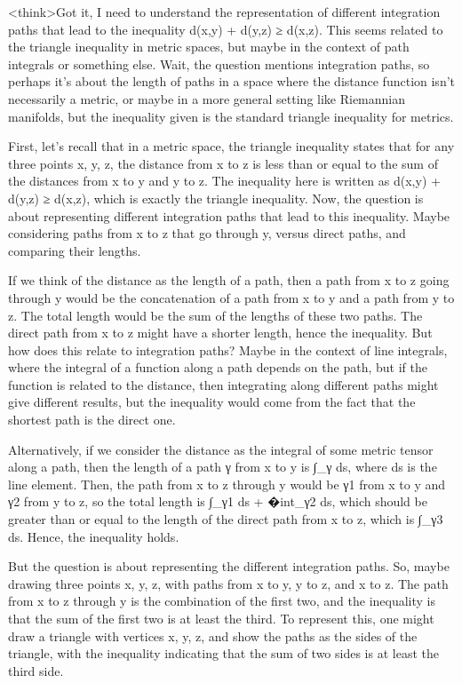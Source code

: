 <think>Got it, I need to understand the representation of different integration paths that lead to the inequality d(x,y) + d(y,z) ≥ d(x,z). This seems related to the triangle inequality in metric spaces, but maybe in the context of path integrals or something else. Wait, the question mentions integration paths, so perhaps it's about the length of paths in a space where the distance function isn't necessarily a metric, or maybe in a more general setting like Riemannian manifolds, but the inequality given is the standard triangle inequality for metrics. 

First, let's recall that in a metric space, the triangle inequality states that for any three points x, y, z, the distance from x to z is less than or equal to the sum of the distances from x to y and y to z. The inequality here is written as d(x,y) + d(y,z) ≥ d(x,z), which is exactly the triangle inequality. Now, the question is about representing different integration paths that lead to this inequality. Maybe considering paths from x to z that go through y, versus direct paths, and comparing their lengths.

If we think of the distance as the length of a path, then a path from x to z going through y would be the concatenation of a path from x to y and a path from y to z. The total length would be the sum of the lengths of these two paths. The direct path from x to z might have a shorter length, hence the inequality. But how does this relate to integration paths? Maybe in the context of line integrals, where the integral of a function along a path depends on the path, but if the function is related to the distance, then integrating along different paths might give different results, but the inequality would come from the fact that the shortest path is the direct one.

Alternatively, if we consider the distance as the integral of some metric tensor along a path, then the length of a path γ from x to y is ∫_γ ds, where ds is the line element. Then, the path from x to z through y would be γ1 from x to y and γ2 from y to z, so the total length is ∫_γ1 ds + �int_γ2 ds, which should be greater than or equal to the length of the direct path from x to z, which is ∫_γ3 ds. Hence, the inequality holds.

But the question is about representing the different integration paths. So, maybe drawing three points x, y, z, with paths from x to y, y to z, and x to z. The path from x to z through y is the combination of the first two, and the inequality is that the sum of the first two is at least the third. To represent this, one might draw a triangle with vertices x, y, z, and show the paths as the sides of the triangle, with the inequality indicating that the sum of two sides is at least the third side.

